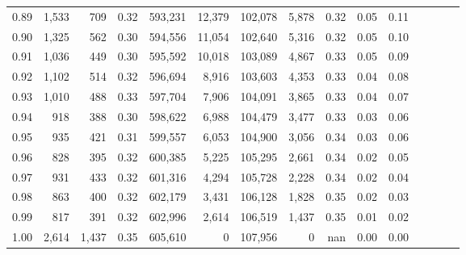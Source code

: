 \begin{tabular}{rrrcrrrrrrrrrrr}
0.89 &   1,533 &    709 &                                       0.32 &  593,231 &   12,379 &  102,078 &    5,878 &  0.32 &  0.05 &                         0.11 \\
0.90 &   1,325 &    562 &                                       0.30 &  594,556 &   11,054 &  102,640 &    5,316 &  0.32 &  0.05 &                         0.10 \\
0.91 &   1,036 &    449 &                                       0.30 &  595,592 &   10,018 &  103,089 &    4,867 &  0.33 &  0.05 &                         0.09 \\
0.92 &   1,102 &    514 &                                       0.32 &  596,694 &    8,916 &  103,603 &    4,353 &  0.33 &  0.04 &                         0.08 \\
0.93 &   1,010 &    488 &                                       0.33 &  597,704 &    7,906 &  104,091 &    3,865 &  0.33 &  0.04 &                         0.07 \\
0.94 &     918 &    388 &                                       0.30 &  598,622 &    6,988 &  104,479 &    3,477 &  0.33 &  0.03 &                         0.06 \\
0.95 &     935 &    421 &                                       0.31 &  599,557 &    6,053 &  104,900 &    3,056 &  0.34 &  0.03 &                         0.06 \\
0.96 &     828 &    395 &                                       0.32 &  600,385 &    5,225 &  105,295 &    2,661 &  0.34 &  0.02 &                         0.05 \\
0.97 &     931 &    433 &                                       0.32 &  601,316 &    4,294 &  105,728 &    2,228 &  0.34 &  0.02 &                         0.04 \\
0.98 &     863 &    400 &                                       0.32 &  602,179 &    3,431 &  106,128 &    1,828 &  0.35 &  0.02 &                         0.03 \\
0.99 &     817 &    391 &                                       0.32 &  602,996 &    2,614 &  106,519 &    1,437 &  0.35 &  0.01 &                         0.02 \\
1.00 &   2,614 &  1,437 &                                       0.35 &  605,610 &        0 &  107,956 &        0 &   nan &  0.00 &                         0.00 \\
\bottomrule
\end{tabular}
